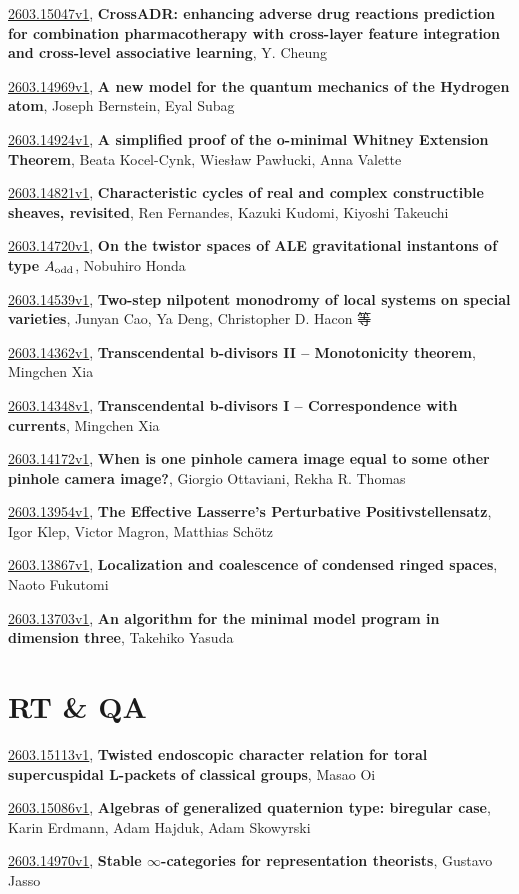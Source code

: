 \documentclass[9pt, a4paper]{article}
\theoremstyle{plain}
\theoremstyle{definition}
\theoremstyle{remark}
\newcommand{\arxiv}[3]{\href{https://arxiv.org/abs/#1}{#1}, \textbf{\textcolor{arxivblue}{#2}}, #3}
\begin{document}
\arxiv{2603.15047v1}{CrossADR: enhancing adverse drug reactions prediction for combination pharmacotherapy with cross-layer feature integration and cross-level associative learning}{Y. Cheung}

\arxiv{2603.14969v1}{A new model for the quantum mechanics of the Hydrogen atom}{Joseph Bernstein, Eyal Subag}

\arxiv{2603.14924v1}{A simplified proof of the o-minimal Whitney Extension Theorem}{Beata Kocel-Cynk, Wiesław Pawłucki, Anna Valette}

\arxiv{2603.14821v1}{Characteristic cycles of real and complex constructible sheaves, revisited}{Ren Fernandes, Kazuki Kudomi, Kiyoshi Takeuchi}

\arxiv{2603.14720v1}{On the twistor spaces of ALE gravitational instantons of type $A_{\rm odd}$}{Nobuhiro Honda}

\arxiv{2603.14539v1}{Two-step nilpotent monodromy of local systems on special varieties}{Junyan Cao, Ya Deng, Christopher D. Hacon 等}

\arxiv{2603.14362v1}{Transcendental b-divisors II -- Monotonicity theorem}{Mingchen Xia}

\arxiv{2603.14348v1}{Transcendental b-divisors I -- Correspondence with currents}{Mingchen Xia}

\arxiv{2603.14172v1}{When is one pinhole camera image equal to some other pinhole camera image?}{Giorgio Ottaviani, Rekha R. Thomas}

\arxiv{2603.13954v1}{The Effective Lasserre's Perturbative Positivstellensatz}{Igor Klep, Victor Magron, Matthias Schötz}

\arxiv{2603.13867v1}{Localization and coalescence of condensed ringed spaces}{Naoto Fukutomi}

\arxiv{2603.13703v1}{An algorithm for the minimal model program in dimension three}{Takehiko Yasuda}


\section{RT \& QA}
\arxiv{2603.15113v1}{Twisted endoscopic character relation for toral supercuspidal L-packets of classical groups}{Masao Oi}

\arxiv{2603.15086v1}{Algebras of generalized quaternion type: biregular case}{Karin Erdmann, Adam Hajduk, Adam Skowyrski}

\arxiv{2603.14970v1}{Stable $\infty$-categories for representation theorists}{Gustavo Jasso}
\end{document}
